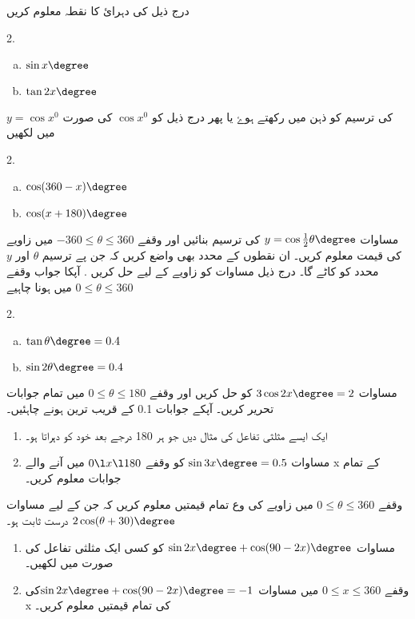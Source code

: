 
درج ذیل کی دہرائ کا نقطہ معلوم کریں
\begin{multicols}{2.}
\begin{enumerate}[a.]
\item \(\sin x\degree\)
\item   \(\tan2x\degree \)
\end{enumerate}
\end{multicols}
\( y=\cos x^{0} \)
کی ترسیم کو ذہن میں رکھتے ہوۓ یا پھر درج ذیل کو \( \cos x^{0} \) کی صورت میں لکھیں 
\begin{multicols}{2.}
\begin{enumerate}[a.]
\item  \(\cos(360-x)\degree \)
\item    \(\cos(x+180)\degree \)
\end{enumerate}
\end{multicols}
مساوات \(y=\cos\frac{1}{2}\theta\degree \) کی ترسیم بنائیں اور وقفے \(-360\le \theta\le 360\) میں زاویے کی قیمت معلوم کریں۔ ان نقطوں کے محدد بھی واضع کریں کہ جن پے ترسیم  \( \theta   \) اور \(   y \) محدد کو کاٹے گا۔
درج ذیل مساوات کو زاویے کے لیے حل کریں . آپکا جواب وقفے \(0\le \theta\le 360\) میں ہونا چاہیے 
\begin{multicols}{2.}
\begin {enumerate}[a.]
\item  \(\tan\theta\degree=0.4 \)
\item    \(\sin2\theta\degree=0.4\)
\end{enumerate}
\end{multicols}



مساوات \(3\cos2x\degree=2 \) کو حل کریں اور وقفے \(0\le \theta\le 180\) میں تمام جوابات تحریر کریں۔ آپکے جوابات 0.1 کے قریب ترین ہونے چاہئیں۔
\begin{enumerate}
\item
ایک ایسے مثلثی تفاعل کی مثال دیں جو ہر 180 درجے بعد خود کو دہراتا ہو۔
\item
مساوات  \(\sin3x\degree=0.5 \) کو  وقفے \(0\l x\l 180\) میں آنے والے   x کے تمام جوابات معلوم کریں۔
\end{enumerate}
وقفے \(0\leq\theta\leq360\) میں زاویے کی وع تمام قیمتیں معلوم کریں کہ جن کے لیے مساوات  \(2\cos(\theta+30)\degree \) درست ثابت ہو۔
\begin{enumerate}
\item
مساوات \(\sin2x\degree+\cos(90-2x)\degree \) کو کسی ایک مثلثی تفاعل کی صورت میں لکھیں۔
\item
وقفے \(0\leq x \leq360\) میں مساوات \(\sin2x\degree+\cos(90-2x)\degree =-1\)کی  x کی تمام قیمتیں معلوم کریں۔

\end{enumerate}


